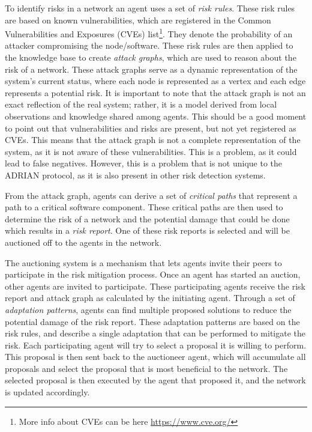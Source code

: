 To identify risks in a network an agent uses a set of \emph{risk rules}. These risk rules are based on known vulnerabilities, which are registered in the Common Vulnerabilities and Exposures (CVEs) list\footnote{More info about CVEs can be here \url{https://www.cve.org/} }. They denote the probability of an attacker compromising the node/software. These risk rules are then applied to the knowledge base to create \emph{attack graphs}, which are used to reason about the risk of a network. These attack graphs serve as a dynamic representation of the system's current status, where each node is represented as a vertex and each edge represents a potential risk. It is important to note that the attack graph is not an exact reflection of the real system; rather, it is a model derived from local observations and knowledge shared among agents. 
This should be a good moment to point out that vulnerabilities and risks are present, but not yet registered as CVEs. This means that the attack graph is not a complete representation of the system, as it is not aware of these vulnerabilities. This is a problem, as it could lead to false negatives. However, this is a problem that is not unique to the ADRIAN protocol, as it is also present in other risk detection systems.


From the attack graph, agents can derive a set of \emph{critical paths} that represent a path to a critical software component. These critical paths are then used to determine the risk of a network and the potential damage that could be done which results in a \emph{risk report}. One of these risk reports is selected and will be auctioned off to the agents in the network.

The auctioning system is a mechanism that lets agents invite their peers to participate in the risk mitigation process. Once an agent has started an auction, other agents are invited to participate. These participating agents receive the risk report and attack graph as calculated by the initiating agent. Through a set of \emph{adaptation patterns}, agents can find multiple proposed solutions to reduce the potential damage of the risk report. These adaptation patterns are based on the risk rules, and describe a single adaptation that can be performed to mitigate the risk.
Each participating agent will try to select a proposal it is willing to perform. This proposal is then sent back to the auctioneer agent, which will accumulate all proposals and select the proposal that is most beneficial to the network. The selected proposal is then executed by the agent that proposed it, and the network is updated accordingly.
